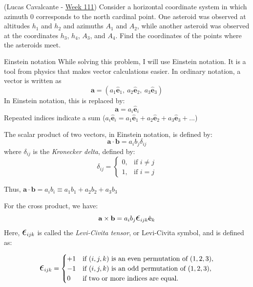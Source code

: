 \documentclass[11pt]{article}
\begin{document}
\begin{pproblem}(Lucas Cavalcante - \href{https://noic.com.br/olimpiadas/astronomia/problemas-da-semana/astronomia-semana-111/}{Week 111})
    Consider a horizontal coordinate system in which azimuth \(0\) corresponds to the north cardinal point. One asteroid was observed at altitudes \(h_1\) and \(h_2\) and azimuths \(A_1\) and \(A_2\), while another asteroid was observed at the coordinates \(h_3\), \(h_4\), \(A_3\), and \(A_4\). Find the coordinates of the points where the asteroids meet.
    
    \begin{psidea}{Einstein notation}{}
    While solving this problem, I will use Einstein notation. It is a tool from physics that makes vector calculations easier. In ordinary notation, a vector is written as
    \[\mathbf{a} = (a_1 \hat{\mathbf{e}}_1, \ a_2 \hat{\mathbf{e}}_2, \ a_3 \hat{\mathbf{e}}_3)\]
    In Einstein notation, this is replaced by:
    \[\mathbf{a} = a_i \hat{\mathbf{e}}_i\]
    Repeated indices indicate a sum (\(a_i \hat{\mathbf{e}}_i = a_1 \hat{\mathbf{e}}_1 + a_2 \hat{\mathbf{e}}_2 + a_3 \hat{\mathbf{e}}_3 + ...\))
    
    The scalar product of two vectors, in Einstein notation, is defined by:
    \[\mathbf{a}\cdot \mathbf{b} = a_i b_j \delta_{ij}\]
    where \(\delta_{ij}\) is the \textit{Kronecker delta}, defined by:
    \[\delta_{ij} = \left \{ \begin{matrix} 0, & \mbox{if } i \ne j \\ 
                                            1, & \mbox{if } i = j\end{matrix} \right.\]
    
    Thus, \(\mathbf{a}\cdot \mathbf{b} = a_i b_i \equiv a_1 b_1 + a_2 b_2 + a_3 b_3\)

    For the cross product, we have:
        \[
        \mathbf{a} \times \mathbf{b} = a_i b_j \Epsilon_{ijk} \hat{\mathbf{e}}_k
        \]
        Here, \(\Epsilon_{ijk}\) is called the \textit{Levi-Civita tensor}, or Levi-Civita symbol, and is defined as:
    
        \[
        \Epsilon_{ijk} = 
        \begin{cases} 
        +1 & \text{if } (i, j, k) \text{ is an even permutation of } (1, 2, 3), \\
        -1 & \text{if } (i, j, k) \text{ is an odd permutation of } (1, 2, 3), \\
        0 & \text{if two or more indices are equal}.
        \end{cases}
        \]


\end{psidea}
\end{pproblem}
\end{document}
